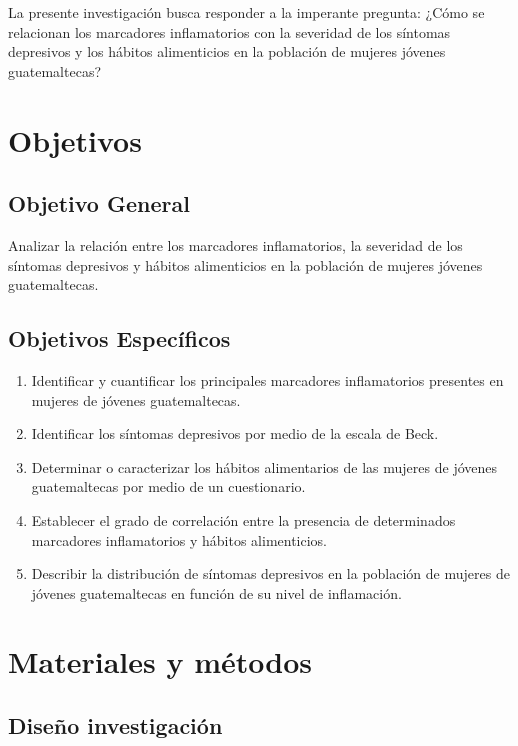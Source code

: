 \documentclass[jou]{apa7}
\begin{document}
	La presente investigación busca responder a la imperante pregunta: ¿Cómo
	se relacionan los marcadores inflamatorios con la severidad de los
	síntomas depresivos y los hábitos alimenticios en la población de
	mujeres jóvenes guatemaltecas?

	\section{Objetivos}\label{objetivos}

	\subsection{Objetivo General}\label{objetivo-general}

	Analizar la relación entre los marcadores inflamatorios, la severidad de
	los síntomas depresivos y hábitos alimenticios en la población de
	mujeres jóvenes guatemaltecas.

	\subsection{Objetivos Específicos}\label{objetivos-especuxedficos}

	\begin{enumerate}
		\item Identificar y cuantificar los principales marcadores inflamatorios presentes en mujeres de jóvenes guatemaltecas.
		\item Identificar los síntomas depresivos por medio de la escala de Beck.
		\item Determinar o caracterizar los hábitos alimentarios de las mujeres de jóvenes guatemaltecas por medio de un cuestionario.
		\item Establecer el grado de correlación entre la presencia de determinados marcadores inflamatorios y hábitos alimenticios.
		\item Describir la distribución de síntomas depresivos en la población de mujeres de jóvenes guatemaltecas en función de su nivel de inflamación.
	\end{enumerate}


	\section{Materiales y métodos}\label{materiales-y-muxe9todos}

	\subsection{Diseño investigación}\label{diseuxf1o-investigaciuxf3n}
\end{document}
